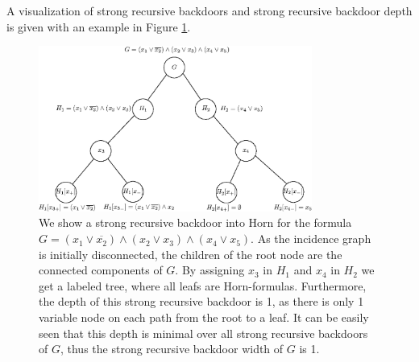 \documentclass[11pt,a4paper]{article}
\theoremstyle{definition}
\theoremstyle{proposition}
\begin{document}
A visualization of strong recursive backdoors and strong recursive backdoor depth is given with an example in Figure \ref{fig:srb-1}. 
\begin{figure}[h]
        \centering
        \includegraphics[width=0.8\textwidth]{figures/srb-to-horn-fixed.eps}   
	\caption{We show a strong recursive backdoor into Horn for the formula $G = (x_1 \lor \overline{x_2}) \land (x_2 \lor x_3) \land (x_4 \lor x_5)$. As the incidence graph is initially disconnected, the children of the root node are the connected components of $G$. By assigning $x_3$ in $H_1$ and $x_4$ in $H_2$ we get a labeled tree, where all leafs are Horn-formulas. Furthermore, the depth of this strong recursive backdoor is 1, as there is only 1 variable node on each path from the root to a leaf. It can be easily seen that this depth is minimal over all strong recursive backdoors of $G$, thus the strong recursive backdoor width of $G$ is 1. }
	\label{fig:srb-1}
\end{figure}
\end{document}
